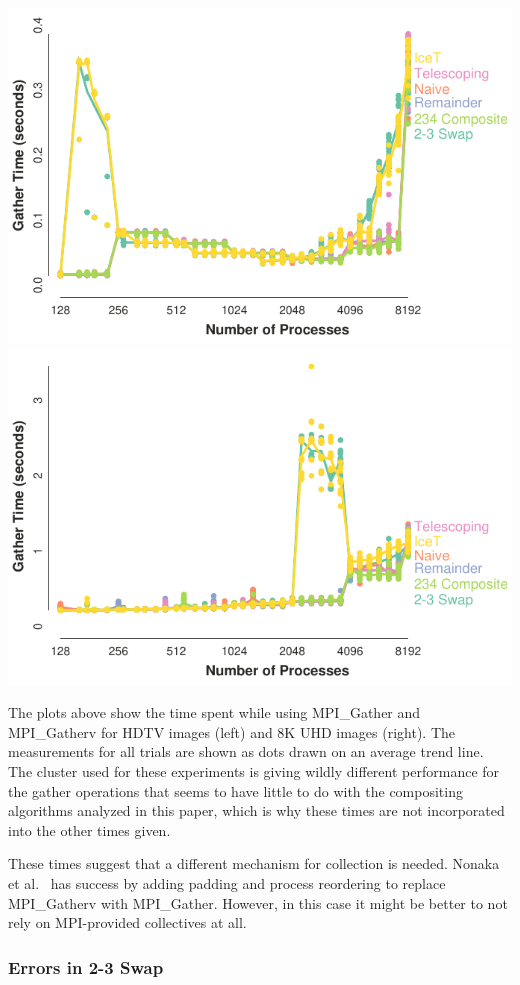 \documentclass{vgtc}                          %
\newcommand*{\scite}[1]{~\cite{#1}}
\newcommand{\etal}{et al.\xspace}
\begin{document}
\noindent
\includegraphics[width=.5\linewidth]{gather-hdtv}%
\includegraphics[width=.5\linewidth]{gather-8k}

The plots above show the time spent while using MPI\_Gather and MPI\_Gatherv for HDTV images (left) and 8K UHD images (right).
The measurements for all trials are shown as dots drawn on an average trend line.
The cluster used for these experiments is giving wildly different performance for the gather operations that seems to have little to do with the compositing algorithms analyzed in this paper, which is why these times are not incorporated into the other times given.

These times suggest that a different mechanism for collection is needed.
Nonaka \etal\scite{Nonaka2018} has success by adding padding and process reordering to replace MPI\_Gatherv with MPI\_Gather.
However, in this case it might be better to not rely on MPI-provided collectives at all.

\subsubsection{Errors in 2-3 Swap}
\label{sec:2-3SwapErrors}
\end{document}
